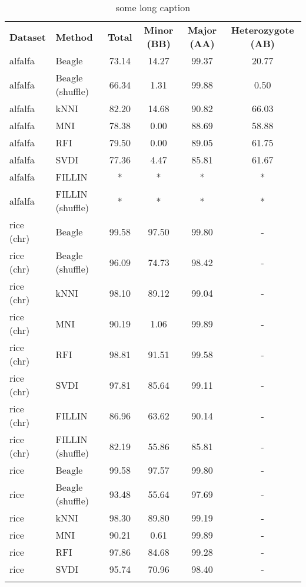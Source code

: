 \begin{table}
\centering
\caption[Accuracy statistics]{some long caption}
\label{tab:accuracy_statistics}
\begin{tabular}{llcccc}
\hline\noalign{\smallskip}
\noalign{\smallskip}\hline\noalign{\smallskip}
\textbf{Dataset} & \textbf{Method} & \textbf{Total} & \textbf{Minor (BB)} & \textbf{Major (AA)} & \textbf{Heterozygote (AB)}\\
\noalign{\smallskip}\Xhline{3\arrayrulewidth}\noalign{\smallskip}
alfalfa & Beagle & 73.14 & 14.27 & 99.37 & 20.77\\
alfalfa & Beagle (shuffle) & 66.34 & 1.31 & 99.88 & 0.50\\
alfalfa & kNNI & 82.20 & 14.68 & 90.82 & 66.03\\
alfalfa & MNI & 78.38 & 0.00 & 88.69 & 58.88\\
alfalfa & RFI  & 79.50 & 0.00 & 89.05 & 61.75\\
alfalfa & SVDI & 77.36 & 4.47 & 85.81 & 61.67\\
alfalfa & FILLIN & * & * & * & *\\
alfalfa & FILLIN (shuffle)  & * & * & * & *\\
rice (chr) & Beagle & 99.58 & 97.50 & 99.80 & -\\
rice (chr) & Beagle (shuffle) & 96.09 & 74.73 & 98.42 & -\\
rice (chr) & kNNI & 98.10 & 89.12 & 99.04 & -\\
rice (chr) & MNI & 90.19 & 1.06 & 99.89 & -\\
rice (chr) & RFI  & 98.81 & 91.51 & 99.58 & -\\
rice (chr) & SVDI & 97.81 & 85.64 & 99.11 & -\\
rice (chr) & FILLIN & 86.96 & 63.62 & 90.14 & -\\
rice (chr) & FILLIN (shuffle)  & 82.19 & 55.86 & 85.81 & -\\
rice & Beagle & 99.58 & 97.57 & 99.80 & -\\
rice & Beagle (shuffle) & 93.48 & 55.64 & 97.69 & -\\
rice & kNNI & 98.30 & 89.80 & 99.19 & -\\
rice & MNI & 90.21 & 0.61 & 99.89 & -\\
rice & RFI  & 97.86 & 84.68 & 99.28 & -\\
rice & SVDI & 95.74 & 70.96 & 98.40 & -\\
\noalign{\smallskip}\hline
\end{tabular}
\end{table}




